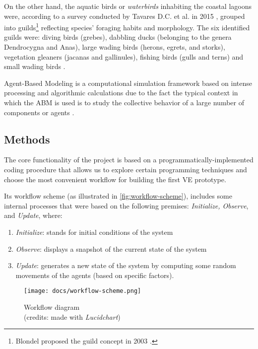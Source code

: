 On the other hand, the aquatic birds or \emph{waterbirds} inhabiting the coastal lagoons were, according to a survey conducted by Tavares D.C. et al. in 2015 \cite{tavares2015environmental}, grouped into guilds\footnote{ Blondel proposed the guild concept in 2003 \cite{blondel2003guilds}.} reflecting species' foraging habits and morphology. The six identified guilds were: diving birds (grebes), dabbling ducks (belonging to the genera Dendrocygna and Anas), large wading birds (herons, egrets, and storks), vegetation gleaners (jacanas and gallinules), fishing birds (gulls and terns) and small wading birds \cite{tavares2014variaccao}.

Agent-Based Modeling is a computational simulation framework based on intense processing and algorithmic calculations due to the fact the typical context in which the ABM is used is to study the collective behavior of a large number of components or agents \cite{rflorent2019veibm1}.

\subsection{Methods}
The core functionality of the project is based on a programmatically-implemented coding procedure that allows us to explore certain programming techniques and choose the most convenient workflow for building the first VE prototype.

Its workflow scheme (as illustrated in \autoref{fig:workflow-scheme}), includes some internal processes that were based on the following premises: \emph{Initialize, Observe}, and \emph{Update}, where:
\begin{enumerate}
    \item \textit{Initialize}: stands for initial conditions of the system
    \item \textit{Observe}: displays a snapshot of the current state of the system
    \item \textit{Update}: generates a new state of the system by computing some random movements of the agents (based on specific factors).
\end{enumerate}

\begin{figure}[!ht]
    \centering
    \texttt{[image: docs/workflow-scheme.png]}
    \caption{Workflow diagram \\ (credits: made with \emph{Lucidchart})}
    \label{fig:workflow-scheme}
\end{figure}

